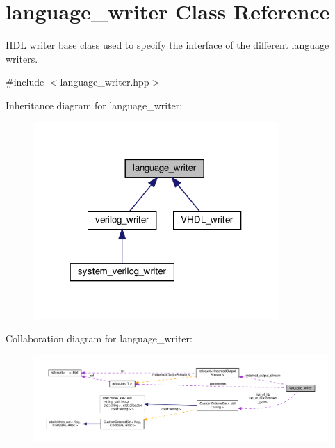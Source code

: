 \hypertarget{classlanguage__writer}{}\section{language\+\_\+writer Class Reference}
\label{classlanguage__writer}


H\+DL writer base class used to specify the interface of the different language writers.  




{\ttfamily \#include $<$language\+\_\+writer.\+hpp$>$}



Inheritance diagram for language\+\_\+writer\+:
\nopagebreak
\begin{figure}[H]
\begin{center}
\leavevmode
\includegraphics[width=265pt]{d3/d8b/classlanguage__writer__inherit__graph}
\end{center}
\end{figure}


Collaboration diagram for language\+\_\+writer\+:
\nopagebreak
\begin{figure}[H]
\begin{center}
\leavevmode
\includegraphics[width=350pt]{d6/d23/classlanguage__writer__coll__graph}
\end{center}
\end{figure}
